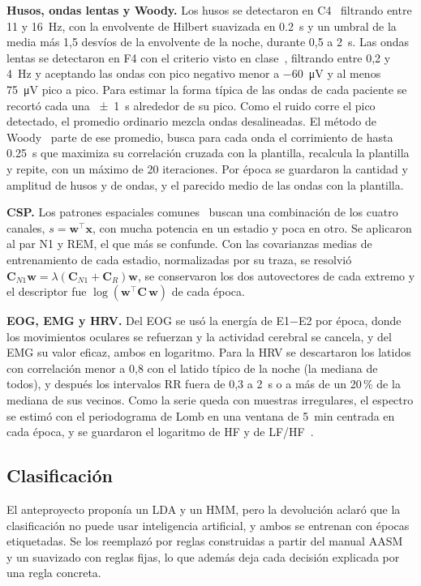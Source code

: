 \textbf{Husos, ondas lentas y Woody.} Los husos se detectaron en C4~\cite{molle2002} filtrando entre 11 y \SI{16}{\hertz}, con la envolvente de Hilbert suavizada en \SI{0,2}{\second} y un umbral de la media más 1,5 desvíos de la envolvente de la noche, durante 0,5 a \SI{2}{\second}. Las ondas lentas se detectaron en F4 con el criterio visto en clase~\cite{piantoni2013}, filtrando entre 0,2 y \SI{4}{\hertz} y aceptando las ondas con pico negativo menor a \SI{-60}{\micro\volt} y al menos \SI{75}{\micro\volt} pico a pico. Para estimar la forma típica de las ondas de cada paciente se recortó cada una \SI{\pm1}{\second} alrededor de su pico. Como el ruido corre el pico detectado, el promedio ordinario mezcla ondas desalineadas. El método de Woody~\cite{woody1967} parte de ese promedio, busca para cada onda el corrimiento de hasta \SI{0,25}{\second} que maximiza su correlación cruzada con la plantilla, recalcula la plantilla y repite, con un máximo de 20 iteraciones. Por época se guardaron la cantidad y amplitud de husos y de ondas, y el parecido medio de las ondas con la plantilla.

\textbf{CSP.} Los patrones espaciales comunes~\cite{ramoser2000} buscan una combinación de los cuatro canales, $s = \mathbf{w}^\top\mathbf{x}$, con mucha potencia en un estadio y poca en otro. Se aplicaron al par N1 y REM, el que más se confunde. Con las covarianzas medias de entrenamiento de cada estadio, normalizadas por su traza, se resolvió $\mathbf{C}_{N1}\mathbf{w} = \lambda(\mathbf{C}_{N1}+\mathbf{C}_{R})\mathbf{w}$, se conservaron los dos autovectores de cada extremo y el descriptor fue $\log(\mathbf{w}^\top\mathbf{C}\,\mathbf{w})$ de cada época.

\textbf{EOG, EMG y HRV.} Del EOG se usó la energía de E1$-$E2 por época, donde los movimientos oculares se refuerzan y la actividad cerebral se cancela, y del EMG su valor eficaz, ambos en logaritmo. Para la HRV se descartaron los latidos con correlación menor a 0,8 con el latido típico de la noche (la mediana de todos), y después los intervalos RR fuera de 0,3 a \SI{2}{\second} o a más de un 20\,\% de la mediana de sus vecinos. Como la serie queda con muestras irregulares, el espectro se estimó con el periodograma de Lomb en una ventana de \SI{5}{\minute} centrada en cada época, y se guardaron el logaritmo de HF y de LF/HF~\cite{taskforce1996}.

\subsection{Clasificación}
\label{sec:clasificacion}
El anteproyecto proponía un LDA y un HMM, pero la devolución aclaró que la clasificación no puede usar inteligencia artificial, y ambos se entrenan con épocas etiquetadas. Se los reemplazó por reglas construidas a partir del manual AASM~\cite{berry2017} y un suavizado con reglas fijas, lo que además deja cada decisión explicada por una regla concreta.

